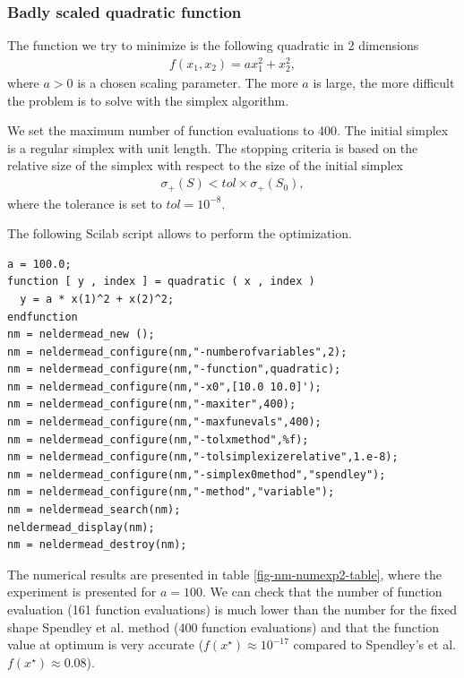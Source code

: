 \subsubsection{Badly scaled quadratic function}

The function we try to minimize is the following quadratic 
in 2 dimensions 
\begin{eqnarray}
\label{quadratic-nm-function2}
f(x_1,x_2) = a x_1^2 + x_2^2,
\end{eqnarray}
where $a>0$ is a chosen scaling parameter. 
The more $a$ is large, the more difficult the problem is 
to solve with the simplex algorithm.

We set the maximum number of function evaluations to 400.
The initial simplex is a regular simplex with unit length.
The stopping criteria is based on the relative size of the simplex 
with respect to the size of the initial simplex 
\begin{eqnarray}
\sigma_+(S) < tol \times \sigma_+(S_0),
\end{eqnarray}
where the tolerance is set to $tol=10^{-8}$.

The following Scilab script allows to perform the optimization.

\lstset{language=scilabscript}
\begin{lstlisting}
a = 100.0;
function [ y , index ] = quadratic ( x , index )
  y = a * x(1)^2 + x(2)^2;
endfunction
nm = neldermead_new ();
nm = neldermead_configure(nm,"-numberofvariables",2);
nm = neldermead_configure(nm,"-function",quadratic);
nm = neldermead_configure(nm,"-x0",[10.0 10.0]');
nm = neldermead_configure(nm,"-maxiter",400);
nm = neldermead_configure(nm,"-maxfunevals",400);
nm = neldermead_configure(nm,"-tolxmethod",%f);
nm = neldermead_configure(nm,"-tolsimplexizerelative",1.e-8);
nm = neldermead_configure(nm,"-simplex0method","spendley");
nm = neldermead_configure(nm,"-method","variable");
nm = neldermead_search(nm);
neldermead_display(nm);
nm = neldermead_destroy(nm);
\end{lstlisting}

The numerical results are presented in table \ref{fig-nm-numexp2-table},
where the experiment is presented for $a=100$. We can check that the 
number of function evaluation (161 function evaluations) is much lower than the number 
for the fixed shape Spendley et al. method (400 function evaluations)
and that the function value at optimum is very accurate ($f(x^\star)\approx 10^{-17}$
compared to Spendley's et al. $f(x^\star) \approx 0.08$).

